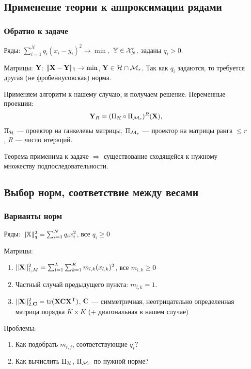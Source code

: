 \documentclass[unicode, notheorems]{beamer}
\begin{document}
\subsection{Применение теории к аппроксимации рядами}
\begin{frame}
	\frametitle{Обратно к задаче}
	Ряды: $\sum \limits_{i=1}^N q_i(x_i - y_i)^2 \to \min,$ $\mathbb{Y} \in \mathcal{X}_N^r$, заданы $q_i > 0$.
	
	Матрицы: $\mathbf{Y}$: $\|\mathbf{X} - \mathbf{Y}\|_? \to \min$, $\mathbf{Y} \in \mathcal{H} \cap \mathcal{M}_r$. Так как $q_i$ задаются, то требуется другая (не фробениусовская)  норма.
	
	\vspace{0.3cm}
	Применяем алгоритм к нашему случаю, и получаем решение. Переменные проекции: 
	\begin{equation*}
	\mathbf{Y}_R = (\Pi_{\mathcal{H}} \circ \Pi_{\mathcal{M}_r})^R (\mathbf{X}),
	\end{equation*}
	$\Pi_{\mathcal{H}}$ --- проектор на ганкелевы матрицы, $\Pi_{\mathcal{M}_r}$ --- проектор на матрицы ранга $\le r$, $R$ --- число итераций.
	
	Теорема применима к задаче $\Rightarrow$ существование сходящейся к нужному множеству подпоследовательности.
\end{frame}

\subsection{Выбор норм, соответствие между весами}
\begin{frame}
	\frametitle{Варианты норм}
	Ряды:
	$\|\mathbb{X}\|_q^2 = \sum_{i = 1}^N q_i x_i^2$, все $q_i \ge 0$
	
	\vspace{0.4cm}
	Матрицы:
		\begin{enumerate}
			\item $\|\mathbf{X}\|_{1, M}^2 = \sum_{l = 1}^L \sum_{k = 1}^K m_{l, k} (x_{l, k})^2$, все $m_{l, k} \ge 0$
			\item Частный случай предыдущего пункта: $m_{l, k} = 1$.
			\item $\|\mathbf{X}\|_{2, \mathbf{C}}^2 = \text{tr}(\mathbf{X} \mathbf{C} \mathbf{X}^{\mathrm{T}})$, $\mathbf{C}$ --- симметричная, неотрицательно определенная матрица порядка $K \times K$ (+ диагональная в нашем случае)
		\end{enumerate}
		
		\vspace{0.4cm}
		Проблемы:
		\begin{enumerate}
			\item Как подобрать $m_{i, j}$, соответствующие $q_i$?
			\item Как вычислить $\Pi_{\mathcal{H}}$, $\Pi_{\mathcal{M}_r}$ по нужной норме?
		\end{enumerate}
\end{frame}
\end{document}
